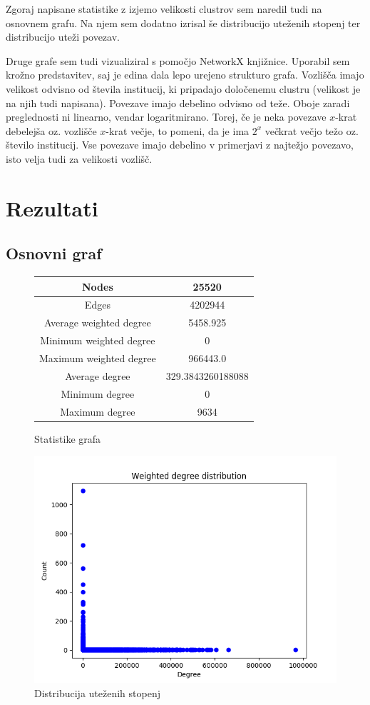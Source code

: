 \documentclass[a4paper,12pt]{article}
\begin{document}
	Zgoraj napisane statistike z izjemo velikosti clustrov sem naredil tudi na osnovnem grafu. Na njem sem dodatno izrisal še distribucijo uteženih stopenj ter distribucijo uteži povezav.
	
	Druge grafe sem tudi vizualiziral s pomočjo NetworkX knjižnice. Uporabil sem krožno predstavitev, saj je edina dala lepo urejeno strukturo grafa. Vozlišča imajo velikost odvisno od števila institucij, ki pripadajo določenemu clustru (velikost je na njih tudi napisana). Povezave imajo debelino odvisno od teže. Oboje zaradi preglednosti ni linearno, vendar logaritmirano. Torej, če je neka povezave $x$-krat debelejša oz. vozlišče $x$-krat večje, to pomeni, da je ima $2^x$ večkrat večjo težo oz. število institucij. Vse povezave imajo debelino v primerjavi z najtežjo povezavo, isto velja tudi za velikosti vozlišč.
	
	\section{Rezultati}
	\subsection{Osnovni graf}
		\begin{figure}[H]
		\centering
		\begin{tabular}{ |c|c| } 
			\hline
			Nodes& 25520 \\
			\hline
			Edges& 4202944 \\
			\hline
			Average weighted degree& 5458.925 \\
			Minimum weighted degree& 0 \\
			Maximum weighted degree& 966443.0 \\
			\hline
			Average degree& 329.3843260188088 \\
			Minimum degree& 0 \\ 
			Maximum degree& 9634 \\
			\hline
		\end{tabular}
		\caption{Statistike grafa}
	\end{figure}

	\begin{figure}[H]
		\centering
		\includegraphics[scale=0.7]{graph_degrees}
		\caption{Distribucija uteženih stopenj}
	\end{figure}
\end{document}
